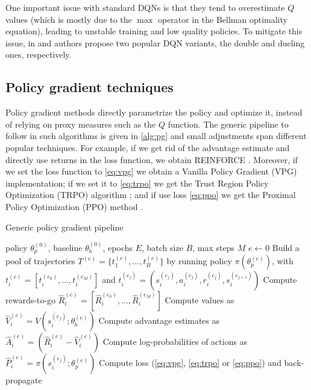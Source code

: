 \documentclass{article}
\begin{document}
One important issue with standard DQNs is that they tend to overestimate $Q$ values (which is mostly due to the $\max$ operator in the Bellman optimality equation), leading to unstable training and low quality policies. To mitigate this issue, in \cite{double-dqn} and \cite{dueling-dqn} authors propose two popular DQN variants, the double and dueling ones, respectively.

\subsection{Policy gradient techniques}
Policy gradient methods directly parametrize the policy and optimize it, instead of relying on proxy measures such as the $Q$ function. The generic pipeline to follow in such algorithms is given in \ref{alg:pg} and small adjustments span different popular techniques. For example, if we get rid of the advantage estimate and directly use returns in the loss function, we obtain REINFORCE \cite{reinforce}. Moreover, if we set the loss function to \ref{eq:vpg} we obtain a Vanilla Policy Gradient (VPG) implementation; if we set it to \ref{eq:trpo} we get the Trust Region Policy Optimization (TRPO) algorithm \cite{trpo}; and if use loss \ref{eq:ppo} we get the Proximal Policy Optimization (PPO) method \cite{ppo}.

\begin{algorithm}[h]
  \caption{Generic policy gradient pipeline}
  \label{alg:pg}
  \begin{algorithmic}[1]
    \Require policy $\theta_p^{(0)}$, baseline $\theta_b^{(0)}$, epochs $E$, batch size $B$, max steps $M$
    \State $e \gets 0$
      \State Build a pool of trajectories $T^{(e)}=\{t_1^{(e)},\dots,t_B^{(e)}\}$ by running policy $\pi(\theta_p^{(e)})$, \newline\hspace*{1.5em}with $t_i^{(e)}=[t_i^{(e_0)},\dots,t_i^{(e_M)}]$ and $t_i^{(e_j)}=(s_i^{(e_j)}, a_i^{(e_j)}, r_i^{(e_j)}, s_i^{(e_{j+1})})$
      \State Compute rewards-to-go $\hat{R}_i^{(e)}=[\hat{R}_i^{(e_0)}, \dots, \hat{R}_i^{(e_M)}]$ 
      \State Compute values as $\hat{V}_i^{(e)}=V(s_i^{(e_j)};\theta_b^{(e)})$ 
      \State Compute advantage estimates as $\hat{A}_i^{(e)}=(\hat{R}_i^{(e)}-\hat{V}_i^{(e)})$
      \State Compute log-probabilities of actions as $\hat{P}_i^{(e)}=\pi(s_i^{(e_j)};\theta_p^{(e)})$ \vspace{1mm}
      \State Compute loss (\ref{eq:vpg}, \ref{eq:trpo} or \ref{eq:ppo}) and back-propagate
    \EndWhile
  \end{algorithmic}
\end{algorithm}
\end{document}
